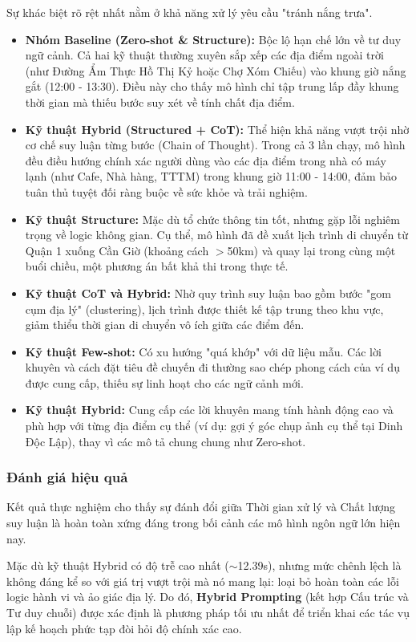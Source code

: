 Sự khác biệt rõ rệt nhất nằm ở khả năng xử lý yêu cầu "tránh nắng trưa".
\begin{itemize}
    \item \textbf{Nhóm Baseline (Zero-shot \& Structure):} Bộc lộ hạn chế lớn về tư duy ngữ cảnh. Cả hai kỹ thuật thường xuyên sắp xếp các địa điểm ngoài trời (như Đường Ẩm Thực Hồ Thị Kỷ hoặc Chợ Xóm Chiếu) vào khung giờ nắng gắt (12:00 - 13:30). Điều này cho thấy mô hình chỉ tập trung lấp đầy khung thời gian mà thiếu bước suy xét về tính chất địa điểm.
    \item \textbf{Kỹ thuật Hybrid (Structured + CoT):} Thể hiện khả năng vượt trội nhờ cơ chế suy luận từng bước (Chain of Thought). Trong cả 3 lần chạy, mô hình đều điều hướng chính xác người dùng vào các địa điểm trong nhà có máy lạnh (như Cafe, Nhà hàng, TTTM) trong khung giờ 11:00 - 14:00, đảm bảo tuân thủ tuyệt đối ràng buộc về sức khỏe và trải nghiệm.
\end{itemize}

\begin{itemize}
    \item \textbf{Kỹ thuật Structure:} Mặc dù tổ chức thông tin tốt, nhưng gặp lỗi nghiêm trọng về logic không gian. Cụ thể, mô hình đã đề xuất lịch trình di chuyển từ Quận 1 xuống Cần Giờ (khoảng cách $>$50km) và quay lại trong cùng một buổi chiều, một phương án bất khả thi trong thực tế.
    \item \textbf{Kỹ thuật CoT và Hybrid:} Nhờ quy trình suy luận bao gồm bước "gom cụm địa lý" (clustering), lịch trình được thiết kế tập trung theo khu vực, giảm thiểu thời gian di chuyển vô ích giữa các điểm đến.
\end{itemize}

\begin{itemize}
    \item \textbf{Kỹ thuật Few-shot:} Có xu hướng "quá khớp" với dữ liệu mẫu. Các lời khuyên và cách đặt tiêu đề chuyến đi thường sao chép phong cách của ví dụ được cung cấp, thiếu sự linh hoạt cho các ngữ cảnh mới.
    \item \textbf{Kỹ thuật Hybrid:} Cung cấp các lời khuyên mang tính hành động cao và phù hợp với từng địa điểm cụ thể (ví dụ: gợi ý góc chụp ảnh cụ thể tại Dinh Độc Lập), thay vì các mô tả chung chung như Zero-shot.
\end{itemize}

\subsubsection{Đánh giá hiệu quả}
Kết quả thực nghiệm cho thấy sự đánh đổi giữa Thời gian xử lý và Chất lượng suy luận là hoàn toàn xứng đáng trong bối cảnh các mô hình ngôn ngữ lớn hiện nay.

Mặc dù kỹ thuật Hybrid có độ trễ cao nhất ($\sim$12.39s), nhưng mức chênh lệch là không đáng kể so với giá trị vượt trội mà nó mang lại: loại bỏ hoàn toàn các lỗi logic hành vi và ảo giác địa lý. Do đó, \textbf{Hybrid Prompting} (kết hợp Cấu trúc và Tư duy chuỗi) được xác định là phương pháp tối ưu nhất để triển khai các tác vụ lập kế hoạch phức tạp đòi hỏi độ chính xác cao.
